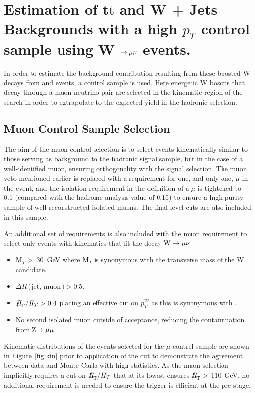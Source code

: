 \section{Estimation of t$\bar{\textrm{t}}$ and W + Jets Backgrounds with a high $p_{T}$ control sample using W $\rightarrow \mu \nu$ events.}
\label{sec:muon}
In order to estimate the background contribution resulting from these boosted W decays from \wj and \ttj events, a control sample is used. Here energetic W bosons that decay through a muon-neutrino pair are selected in the kinematic region of the search in order to extrapolate to the expected yield in the hadronic selection.
\subsection{Muon Control Sample Selection}

The aim of the muon control selection is to select events kinematically similar to those serving as background to the hadronic signal sample, but in the case of a well-identified muon, ensuring orthogonality with the signal selection. The muon veto mentioned earlier is replaced with a requirement for one, and only one, $\mu$ in the event, and the isolation requirement in the definition of a $\mu$ is tightened to 0.1 (compared with the hadronic analysis value of 0.15) to ensure a high purity sample of well reconstructed isolated muons. The final level cuts are also included in this sample.

An additional set of requirements is also included with the muon requirement to select only events with kinematics that fit the decay $\textrm{W} \rightarrow \mu \nu$:
\begin{itemize}
\item M$_{T} >$ 30~GeV where M$_{T}$ is synonymous with the transverse mass of the W candidate.
\item $\Delta R$\,$($\,$\textrm{jet, muon}$\,$) > 0.5$.
\item $\MHT / \HT > 0.4$ placing an effective cut on $p_{T}^{W}$ as this is synonymous with \MHT.
\item No second isolated muon outside of acceptance, reducing the contamination from Z$ \rightarrow \mu \mu$.
\end{itemize}

Kinematic distributions of the events selected for the $\mu$ control sample are shown in Figure~\ref{fig:kin} prior to application of the \alt cut to demonstrate the agreement between data and Monte Carlo with high statistics. As the muon selection implicitly requires a cut on $\MHT / \HT$ that at its lowest ensures $\MHT >$ 110~GeV, no additional requirement is needed to ensure the trigger is efficient at the pre-\alt stage.

